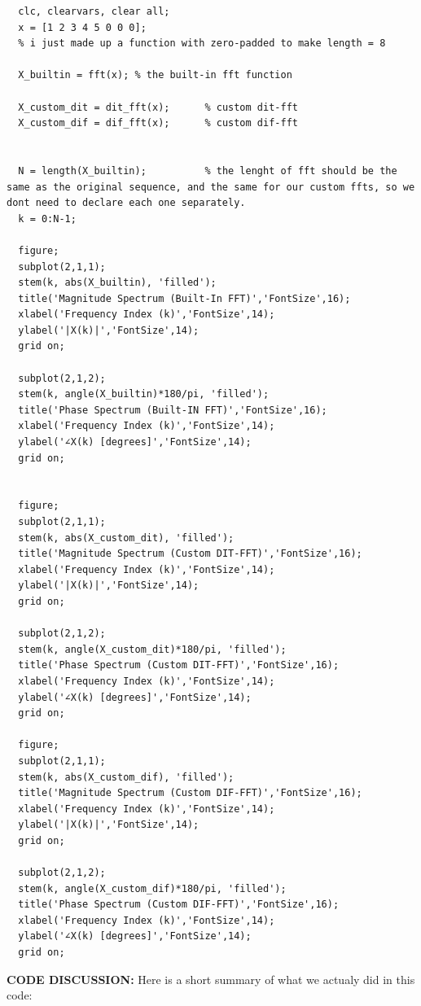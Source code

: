 \documentclass[12pt]{report}
\begin{document}
  \begin{lstlisting}[caption={Code to call our functions}]
  % to verify the custom functions vs the built-in functions
  clc, clearvars, clear all;
  x = [1 2 3 4 5 0 0 0];
  % i just made up a function with zero-padded to make length = 8

  X_builtin = fft(x); % the built-in fft function

  X_custom_dit = dit_fft(x);      % custom dit-fft
  X_custom_dif = dif_fft(x);      % custom dif-fft


  N = length(X_builtin);          % the lenght of fft should be the same as the original sequence, and the same for our custom ffts, so we dont need to declare each one separately.
  k = 0:N-1;

  figure;
  subplot(2,1,1);
  stem(k, abs(X_builtin), 'filled');
  title('Magnitude Spectrum (Built-In FFT)','FontSize',16);
  xlabel('Frequency Index (k)','FontSize',14);
  ylabel('|X(k)|','FontSize',14);
  grid on;

  subplot(2,1,2);
  stem(k, angle(X_builtin)*180/pi, 'filled');
  title('Phase Spectrum (Built-IN FFT)','FontSize',16);
  xlabel('Frequency Index (k)','FontSize',14);
  ylabel('∠X(k) [degrees]','FontSize',14);
  grid on;


  figure;
  subplot(2,1,1);
  stem(k, abs(X_custom_dit), 'filled');
  title('Magnitude Spectrum (Custom DIT-FFT)','FontSize',16);
  xlabel('Frequency Index (k)','FontSize',14);
  ylabel('|X(k)|','FontSize',14);
  grid on;

  subplot(2,1,2);
  stem(k, angle(X_custom_dit)*180/pi, 'filled');
  title('Phase Spectrum (Custom DIT-FFT)','FontSize',16);
  xlabel('Frequency Index (k)','FontSize',14);
  ylabel('∠X(k) [degrees]','FontSize',14);
  grid on;

  figure;
  subplot(2,1,1);
  stem(k, abs(X_custom_dif), 'filled');
  title('Magnitude Spectrum (Custom DIF-FFT)','FontSize',16);
  xlabel('Frequency Index (k)','FontSize',14);
  ylabel('|X(k)|','FontSize',14);
  grid on;

  subplot(2,1,2);
  stem(k, angle(X_custom_dif)*180/pi, 'filled');
  title('Phase Spectrum (Custom DIF-FFT)','FontSize',16);
  xlabel('Frequency Index (k)','FontSize',14);
  ylabel('∠X(k) [degrees]','FontSize',14);
  grid on;
  \end{lstlisting} 
  \vspace{0.2in}
  \textbf{CODE DISCUSSION:}
  Here is a short summary of what we actualy did in this code:
\end{document}
